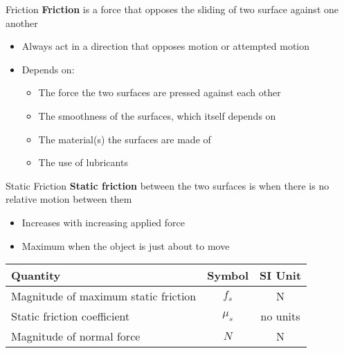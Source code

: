 \documentclass[12pt,compress,aspectratio=169]{beamer}
\begin{document}
\begin{frame}{Friction}
  \textbf{Friction} is a force that opposes the sliding of two surface against
  one another
  \begin{itemize}
  \item Always act in a direction that opposes motion or attempted motion
  \item Depends on:
    \begin{itemize}
    \item The force the two surfaces are pressed against each other
    \item The smoothness of the surfaces, which itself depends on
    \item The material(s) the surfaces are made of
    \item The use of lubricants
    \end{itemize}
  \end{itemize}
  \begin{center}
  \end{center}
\end{frame}



\begin{frame}{Static Friction}
  \textbf{Static friction} between the two surfaces is when there is no
  relative motion between them
  \begin{itemize}
  \item Increases with increasing applied force
  \item Maximum when the object is just about to move
  \end{itemize}

  \begin{center}
    \begin{tabular}{l|c|c}
      \rowcolor{pink}
      \textbf{Quantity} & \textbf{Symbol} & \textbf{SI Unit} \\ \hline
      Magnitude of maximum static friction & $f_s$ & \si{\newton} \\
      Static friction coefficient  & $\mu_s$ & no units \\
      Magnitude of normal force    & $N$ & \si{\newton}
    \end{tabular}
  \end{center}
\end{frame}
\end{document}
